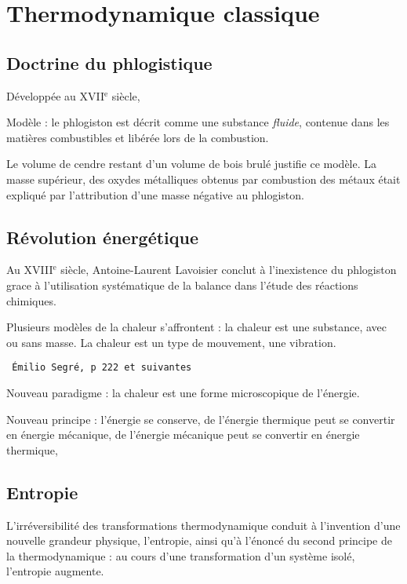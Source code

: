 

\section{Thermodynamique classique}

 \subsection{Doctrine du phlogistique}

Développée au {\footnotesize XVII}$^\text{e}$ siècle, 


Modèle : le phlogiston est décrit comme une substance {\it fluide}, contenue dans les matières combustibles et libérée	 lors de la combustion.

Le volume de cendre restant d'un volume de bois brulé justifie ce modèle. La masse supérieur, des oxydes métalliques obtenus par combustion des métaux était expliqué par l'attribution d'une masse négative au phlogiston.

 \subsection{Révolution énergétique}

Au {\footnotesize XVIII}$^\text{e}$ siècle, Antoine-Laurent Lavoisier conclut à l'inexistence du phlogiston grace à l'utilisation systématique de la balance dans l'étude des réactions chimiques.

Plusieurs modèles de la chaleur s'affrontent : la chaleur est une substance, avec ou sans masse. La chaleur est un type de mouvement, une vibration.

\texttt{ Émilio Segré, p 222 et suivantes}

Nouveau paradigme : la chaleur est une forme microscopique de l'énergie.

Nouveau principe : l'énergie se conserve, de l'énergie thermique peut se convertir en énergie mécanique, de l'énergie mécanique peut se convertir en énergie thermique, 

 \subsection{Entropie}
L'irréversibilité des transformations thermodynamique conduit à l'invention d'une nouvelle grandeur physique, l'entropie, ainsi qu'à l'énoncé du second principe de la thermodynamique : au cours d'une transformation d'un système isolé, l'entropie augmente.






